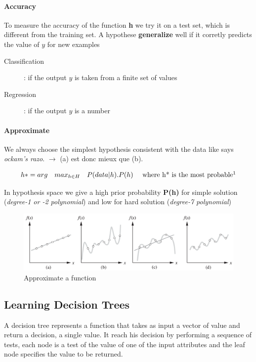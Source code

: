 \paragraph{Accuracy} To measure the accuracy of the function \textbf{h} we try it on a test set, which is different from the training set.
A hypothese \textbf{generalize} well if it corretly predicts the value of $y$ for new examples

\begin{description}
    \item[Classification] : if the output $y$ is taken from a finite set of values
    \item[Regression] : if the output $y$ is a number
\end{description}

\paragraph{Approximate} We always choose the simplest hypothesis consistent with the data
like says \textit{ockam's razo}. $\to$ (a) est donc mieux que (b).

$$ h* = arg \quad max_{h \in H} \quad P(data|h) . P(h)  \quad \textrm{ where h* is the most probable}\footnotemark$$

In  hypothesis  space  we  give  a high  prior  probability \textbf{P(h)}  for  simple
solution (\textit{degree-1 or -2 polynomial})  and low for hard solution
(\textit{degree-7 polynomial})

\begin{figure}[h]
    \centering
    \includegraphics[width=14cm]{razor.png}
    \caption{Approximate a function}
\end{figure}

\subsection{Learning Decision Trees}
A decision tree represents a function that takes as input a vector of value and return a decision, a single value. It reach his decision
by performing a sequence of tests, each node is a test of the value of one of the input attributes and the leaf node specifies the value to be
returned.

